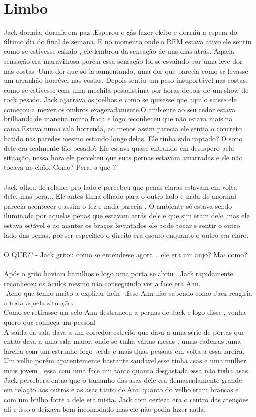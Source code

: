 \documentclass{book}
\begin{document}
\section*{Limbo}
Jack dormia, dormia em paz .Esperou o gás fazer efeito e dormiu a espera do último dia do final de semana. E no momento onde o REM estava ativo ele sentiu como se estivesse caindo , ele lembrou da sensação de uns dias atrás. Aquela sensação era maravilhosa porém essa sensação foi se esvaindo por uma leve dor nas costas. Uma dor que só ia aumentando, uma dor que parecia como se levasse um arranhão horrével nas costas. Depois sentiu um peso insuportável nas costas, como se estivesse com uma mochila pesadissima por horas depois de um show de rock pesado. Jack agarrava os joelhos e como se quisesse que aquilo saisse ele começou a mexer os ombros exageradamente.O ambiente ao seu redor estava brilhando de maneira muito fraca e logo reconheceu que não estava mais na cama.Estava numa sala horrenda, ao menos assim parecia ele sentia o concreto batido nas paredes mesmo estando longe delas. Ele tinha sido raptado? O sono dele era realmente tão pesado? Ele estava quase entrando em desespero pela situação, nessa hora ele percebeu que suas pernas estavam amarradas e ele não tocava no chão. Como? Pera, o que ?\\\\
Jack olhou de relance pro lado e percebeu que penas claras estavam em volta dele, mas pera... Ele antes tinha olhado para o outro lado e nada de anormal parecia acontecer e assim o fez e nada parecia .  O ambiente só estava sendo iluminado por aquelas penas que estavam atrás dele e que sim eram dele ,mas ele estava estável e ao manter os braços levantados ele pode tocar e sentir o outro lado das penas, por ser especifico o direito era escuro enquanto o outro era claro. \\\\
O QUE?? - Jack gritou como se entendesse agora .. ele era um anjo? Mas como?\\\\
Após o grito haviam barulhos e logo uma porta se abriu , Jack rapidamente reconheceu os óculos mesmo não conseguindo ver a face era Ann.\\
-Acho que tenho muito a explicar hein- disse Ann não sabendo como Jack reagiria a toda aquela situação. \\
Como se retirasse um selo Ann destrancou a pernas de Jack e logo disse , venha quero que conheça um pessoal\\
 A saída da sala dava a um corredor estreito que dava a uma série de portas que então dava a uma sala maior, onde se tinha várias mesas , umas cadeiras ,uma lareira com um estranho fogo verde e mais duas pessoas em volta a essa lareira. Um velho porém aparentemente bastante saudavel,esse tinha asas e uma mulher mais jovem , essa com uma face um tanto quanto desgastada essa não tinha asas. Jack percebera então que o tamanho das asas dele era demasiadamente grande em relação aos outros e as asas tanto de Ann quanto do velho eram brancas e com um brilho forte a dele era mista. Jack com certeza era o centro das atenções ali e isso o deixava bem incomodado mas ele não podia fazer nada.\\
\end{document}
